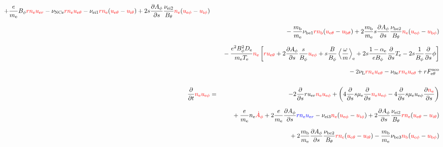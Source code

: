 \documentclass[11pt]{article}
\def\r#1{{\rm#1}}
\def\ddt{\frac{\partial}{\partial t}}
\def\dds{\frac{\partial}{\partial s}}
\def\dd#1{\frac{\partial #1}{\partial s}}
\def\ave#1{\left\langle#1\right\rangle}
\def\me{m_\r{e}}
\def\mb{m_\r{b}}
\def\mue{\mu_\r{e}}
\def\De{D_\r{e}}
\def\Di{D_\r{i}}
\def\nee{n_\r{e}}
\def\ni{n_\r{i}}
\def\nb{n_\r{b}}
\def\uer{u_{\r{e}r}}
\def\ueth{u_{\r{e}\theta}}
\def\uith{u_{\r{i}\theta}}
\def\ubth{u_{\r{b}\theta}}
\def\ueph{u_{\r{e}\phi}}
\def\uiph{u_{\r{i}\phi}}
\def\ubph{u_{\r{b}\phi}}
\def\Bth{B_\theta}
\def\Bph{B_\phi}
\def\Aphd{\dot{A}_\phi}
\def\Aph{A_\phi}
\def\Te{T_\r{e}}
\def\Ti{T_\r{i}}
\def\Zi{Z_\r{i}}
\def\nuNCe{\nu_\r{NCe}}
\def\nune{\nu_\r{0e}}
\def\nuL{\nu_\r{L}}
\def\red#1{\textcolor{red}{#1}}
\def\blue#1{\textcolor{blue}{#1}}
\begin{document}
\begin{eqnarray}
%
  + \frac{e}{\me} \Bph \red{r \nee \uer}
%
  - \nuNCe \red{r \nee \ueth}
%
  - \nu_\r{ei1} \red{r \nee} (\red{\ueth} - \red{\uith})
%
  + 2 s \dd{\Aph} \frac{\nu_\r{ei2}}{\Bth} \red{\nee} (\red{\ueph} - \red{\uiph})
\nonumber\\[2.5mm]&&{}
%
  - \frac{\mb}{\me} \nu_\r{be1} \red{r \nb} (\red{\ueth} - \red{\ubth})
%
  + 2 \frac{\mb}{\me} s \dd{\Aph} \frac{\nu_\r{be2}}{\Bth} \red{\nee}
  (\red{\ueph} - \red{\ubph})
\nonumber\\[2.5mm]&&{}
%
%
  - \frac{e^2 \Bph^2 \De}{\me\Te}\red{\nee}
    \left[\red{r \ueth} + 2\dd{\Aph}\frac{s}{\Bph}\red{\ueph}
     + s \frac{B}{\Bph}\ave{\frac{\omega}{m}}_\r{e}
     + 2 s \frac{1-\alpha_\r{e}}{e\Bph} \dds \Te
     - 2 s \frac{1}{\Bph} \dds \phi\right]
\nonumber\\[2.5mm]&&{}
%
%
  - 2 \nuL \red{r \nee \ueth}
%
  - \nune \red{r \nee \ueth}
%
%
%
%
  + r F_{\r{e}\theta}^\r{neo}
\\[5mm]
  \ddt \red{\nee \ueph} &=&
%
  - 2 \dds r \uer \red{\nee \ueph}
%
  + \left(   4 \dds s \mue \dds \red{\nee \ueph}
%
           - 4 \dds s \mue \ueph \dd{\red{\nee}} \right)
\nonumber\\[2.5mm]&&{}
%
  + \frac{e}{\me} \nee \red{\Aphd}
%
  + 2 \frac{e}{\me} \dd{\Aph} \blue{r \nee \uer} 
%
  - \nu_\r{ei3} \red{\nee} (\red{\ueph} - \red{\uiph})
%
  + 2 \dd{\Aph} \frac{\nu_\r{ei2}}{\Bth} \red{r \nee} (\red{\ueth} - \red{\uith})
\nonumber\\[2.5mm]&&{}
%
  + 2 \frac{\mb}{\me} \dd{\Aph} \frac{\nu_\r{be2}}{\Bth} \red{r \nee} (\red{\ueth} - \red{\uith})
%
  - \frac{\mb}{\me} \nu_\r{be3} \red{\nb} (\red{\ueph} - \red{\ubph})
\nonumber\\[2.5mm]&&{}
%

\end{eqnarray}
\end{document}
